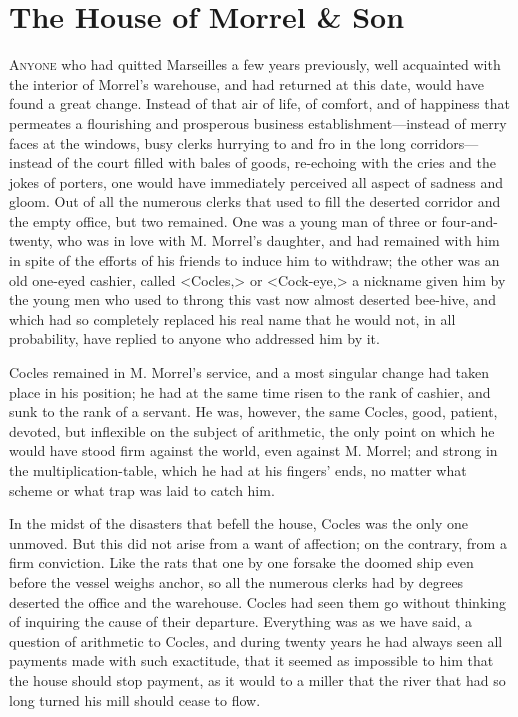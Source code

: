 \chapter{The House of Morrel \& Son}

 \lettrine{A}{nyone} who had quitted Marseilles a few years previously, well acquainted with the interior of Morrel's warehouse, and had returned at this date, would have found a great change. Instead of that air of life, of comfort, and of happiness that permeates a flourishing and prosperous business establishment—instead of merry faces at the windows, busy clerks hurrying to and fro in the long corridors—instead of the court filled with bales of goods, re-echoing with the cries and the jokes of porters, one would have immediately perceived all aspect of sadness and gloom. Out of all the numerous clerks that used to fill the deserted corridor and the empty office, but two remained. One was a young man of three or four-and-twenty, who was in love with M. Morrel's daughter, and had remained with him in spite of the efforts of his friends to induce him to withdraw; the other was an old one-eyed cashier, called <Cocles,> or <Cock-eye,> a nickname given him by the young men who used to throng this vast now almost deserted bee-hive, and which had so completely replaced his real name that he would not, in all probability, have replied to anyone who addressed him by it. 

 Cocles remained in M. Morrel's service, and a most singular change had taken place in his position; he had at the same time risen to the rank of cashier, and sunk to the rank of a servant. He was, however, the same Cocles, good, patient, devoted, but inflexible on the subject of arithmetic, the only point on which he would have stood firm against the world, even against M. Morrel; and strong in the multiplication-table, which he had at his fingers' ends, no matter what scheme or what trap was laid to catch him. 

 In the midst of the disasters that befell the house, Cocles was the only one unmoved. But this did not arise from a want of affection; on the contrary, from a firm conviction. Like the rats that one by one forsake the doomed ship even before the vessel weighs anchor, so all the numerous clerks had by degrees deserted the office and the warehouse. Cocles had seen them go without thinking of inquiring the cause of their departure. Everything was as we have said, a question of arithmetic to Cocles, and during twenty years he had always seen all payments made with such exactitude, that it seemed as impossible to him that the house should stop payment, as it would to a miller that the river that had so long turned his mill should cease to flow. 

